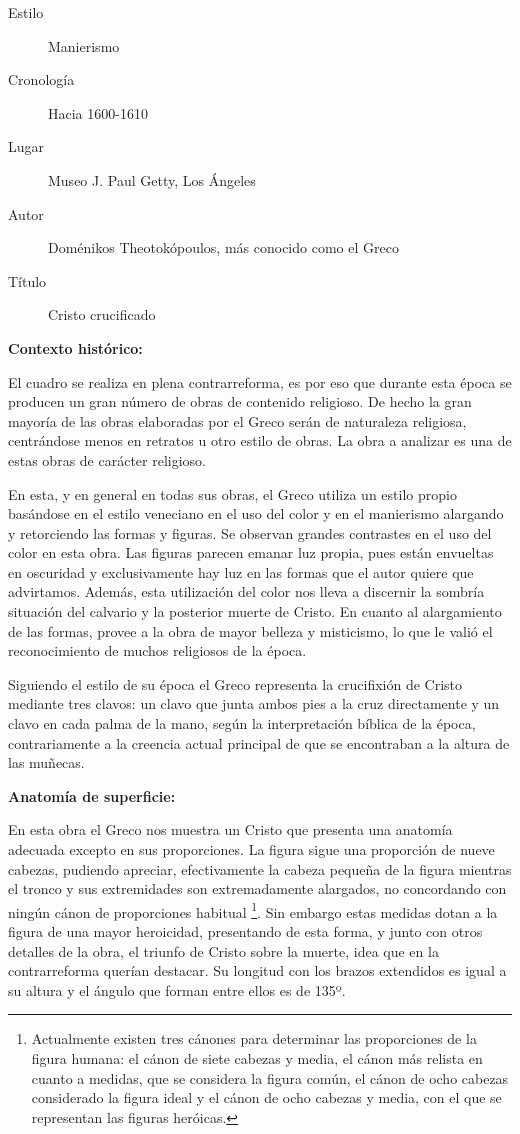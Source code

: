 \begin{description}
\item[Estilo] Manierismo
\item[Cronología] Hacia 1600-1610
\item[Lugar] Museo J. Paul Getty, Los Ángeles
\item[Autor] Doménikos Theotokópoulos, más conocido como el Greco
\item[Título] Cristo crucificado
\end{description}

\textbf{Contexto histórico:}

El cuadro se realiza en plena contrarreforma, es por eso que durante esta época se producen un gran número de obras de contenido religioso. De hecho la gran mayoría de las obras elaboradas por el Greco serán de naturaleza religiosa, centrándose menos en retratos u otro estilo de obras. La obra a analizar es una de estas obras de carácter religioso.

En esta, y en general en todas sus obras, el Greco utiliza un estilo propio basándose en el estilo veneciano en el uso del color y en el manierismo alargando y retorciendo las formas y figuras. Se observan grandes contrastes en el uso del color en esta obra. Las figuras parecen emanar luz propia, pues están envueltas en oscuridad y exclusivamente hay luz en las formas que el autor quiere que advirtamos. Además, esta utilización del color nos lleva a discernir la sombría situación del calvario y la posterior muerte de Cristo. En cuanto al alargamiento de las formas, provee a la obra de mayor belleza y misticismo, lo que le valió el reconocimiento de muchos religiosos de la época.

Siguiendo el estilo de su época el Greco representa la crucifixión de Cristo mediante tres clavos: un clavo que junta ambos pies a la cruz directamente y un clavo en cada palma de la mano, según la interpretación bíblica de la época, contrariamente a la creencia actual principal de que se encontraban a la altura de las muñecas.


\vspace{12pt}
\textbf{Anatomía de superficie:}

En esta obra el Greco nos muestra un Cristo que presenta una anatomía adecuada excepto en sus proporciones. La figura sigue una proporción de nueve cabezas, pudiendo apreciar, efectivamente la cabeza pequeña de la figura mientras el tronco y sus extremidades son extremadamente alargados, no concordando con ningún cánon de proporciones habitual \footnote{Actualmente existen tres cánones para determinar las proporciones de la figura humana: el cánon de siete cabezas y media, el cánon más relista en cuanto a medidas, que se considera la figura común, el cánon de ocho cabezas considerado la figura ideal y el cánon de ocho cabezas y media, con el que se representan las figuras heróicas.}. Sin embargo estas medidas dotan a la figura de una mayor heroicidad, presentando de esta forma, y junto con otros detalles de la obra, el triunfo de Cristo sobre la muerte, idea que en la contrarreforma querían destacar. Su longitud con los brazos extendidos es igual a su altura y el ángulo que forman entre ellos es de 135º.

